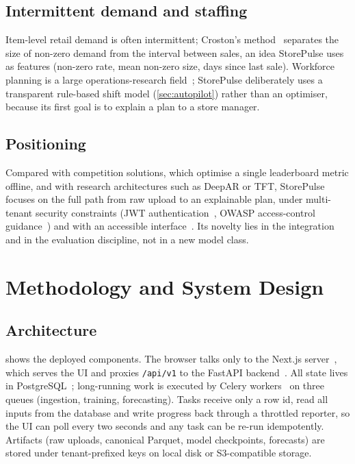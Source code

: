 \documentclass[conference]{IEEEtran}
\newcommand{\code}[1]{\texttt{\small #1}}
\begin{document}
\subsection{Intermittent demand and staffing}
Item-level retail demand is often intermittent; Croston's method~\cite{croston1972intermittent}
separates the size of non-zero demand from the interval between sales, an idea StorePulse uses as
features (non-zero rate, mean non-zero size, days since last sale). Workforce planning is a large
operations-research field~\cite{ernst2004staff}; StorePulse deliberately uses a transparent
rule-based shift model (\cref{sec:autopilot}) rather than an optimiser, because its first goal is to
explain a plan to a store manager.

\subsection{Positioning}
Compared with competition solutions, which optimise a single leaderboard metric offline, and with
research architectures such as DeepAR or TFT, StorePulse focuses on the full path from raw upload to
an explainable plan, under multi-tenant security constraints (JWT authentication~\cite{rfc7519},
OWASP access-control guidance~\cite{owasp2021top10}) and with an accessible interface~\cite{w3c2023wcag22}.
Its novelty lies in the integration and in the evaluation discipline, not in a new model class.

\section{Methodology and System Design}\label{sec:design}

\subsection{Architecture}
 shows the deployed components. The browser talks only to the Next.js
server~\cite{nextjsdocs}, which serves the UI and proxies \code{/api/v1} to the FastAPI
backend~\cite{fastapidocs}. All state lives in PostgreSQL~\cite{postgresdocs}; long-running work is
executed by Celery workers~\cite{celerydocs} on three queues (ingestion, training, forecasting).
Tasks receive only a row id, read all inputs from the database and write progress back through a
throttled reporter, so the UI can poll every two seconds and any task can be re-run idempotently.
Artifacts (raw uploads, canonical Parquet, model checkpoints, forecasts) are stored under
tenant-prefixed keys on local disk or S3-compatible storage.
\end{document}
